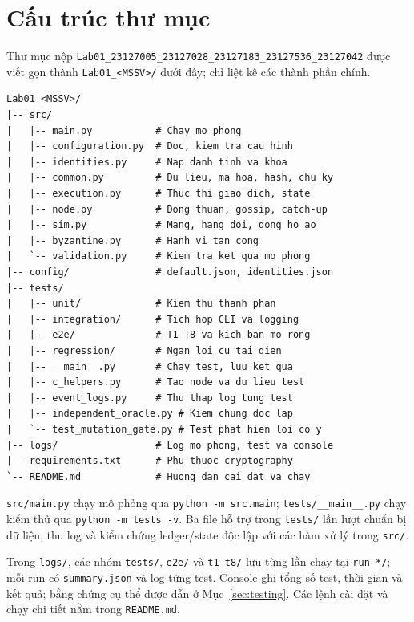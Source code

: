 \section{Cấu trúc thư mục}
\label{sec:project-structure}

Thư mục nộp \texttt{Lab01\_23127005\_23127028\_23127183\_23127536\_23127042} được viết gọn thành \texttt{Lab01\_<MSSV>/} dưới đây; chỉ liệt kê các thành phần chính.

\begin{lstlisting}[basicstyle=\ttfamily\footnotesize,numbers=none,caption={Cấu trúc thư mục nộp bài},label={lst:project-tree}]
Lab01_<MSSV>/
|-- src/
|   |-- main.py           # Chay mo phong
|   |-- configuration.py  # Doc, kiem tra cau hinh
|   |-- identities.py     # Nap danh tinh va khoa
|   |-- common.py         # Du lieu, ma hoa, hash, chu ky
|   |-- execution.py      # Thuc thi giao dich, state
|   |-- node.py           # Dong thuan, gossip, catch-up
|   |-- sim.py            # Mang, hang doi, dong ho ao
|   |-- byzantine.py      # Hanh vi tan cong
|   `-- validation.py     # Kiem tra ket qua mo phong
|-- config/               # default.json, identities.json
|-- tests/
|   |-- unit/             # Kiem thu thanh phan
|   |-- integration/      # Tich hop CLI va logging
|   |-- e2e/              # T1-T8 va kich ban mo rong
|   |-- regression/       # Ngan loi cu tai dien
|   |-- __main__.py       # Chay test, luu ket qua
|   |-- c_helpers.py      # Tao node va du lieu test
|   |-- event_logs.py     # Thu thap log tung test
|   |-- independent_oracle.py # Kiem chung doc lap
|   `-- test_mutation_gate.py # Test phat hien loi co y
|-- logs/                 # Log mo phong, test va console
|-- requirements.txt      # Phu thuoc cryptography
`-- README.md             # Huong dan cai dat va chay
\end{lstlisting}

\texttt{src/main.py} chạy mô phỏng qua \texttt{python -m src.main}; \texttt{tests/\_\_main\_\_.py} chạy kiểm thử qua \texttt{python -m tests -v}. Ba file hỗ trợ trong \texttt{tests/} lần lượt chuẩn bị dữ liệu, thu log và kiểm chứng ledger/state độc lập với các hàm xử lý trong \texttt{src/}.

Trong \texttt{logs/}, các nhóm \texttt{tests/}, \texttt{e2e/} và \texttt{t1-t8/} lưu từng lần chạy tại \texttt{run-*/}; mỗi run có \texttt{summary.json} và log từng test. Console ghi tổng số test, thời gian và kết quả; bằng chứng cụ thể được dẫn ở Mục~\ref{sec:testing}. Các lệnh cài đặt và chạy chi tiết nằm trong \texttt{README.md}.
